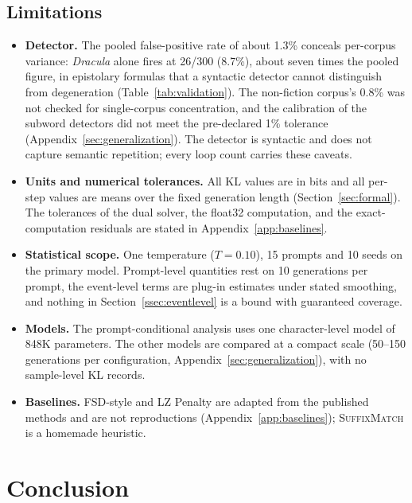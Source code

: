 \documentclass[11pt]{article}
\begin{document}
\subsection{Limitations}
\begin{itemize}[leftmargin=*]
  \item \textbf{Detector.} The pooled false-positive rate of about 1.3\% conceals per-corpus variance: \emph{Dracula} alone fires at 26/300 (8.7\%), about seven times the pooled figure, in epistolary formulas that a syntactic detector cannot distinguish from degeneration (Table~\ref{tab:validation}). The non-fiction corpus's 0.8\% was not checked for single-corpus concentration, and the calibration of the subword detectors did not meet the pre-declared 1\% tolerance (Appendix~\ref{sec:generalization}). The detector is syntactic and does not capture semantic repetition; every loop count carries these caveats.
  \item \textbf{Units and numerical tolerances.} All KL values are in bits and all per-step values are means over the fixed generation length (Section~\ref{sec:formal}). The tolerances of the dual solver, the float32 computation, and the exact-computation residuals are stated in Appendix~\ref{app:baselines}.
  \item \textbf{Statistical scope.} One temperature ($T{=}0.10$), 15 prompts and 10 seeds on the primary model. Prompt-level quantities rest on 10 generations per prompt, the event-level terms are plug-in estimates under stated smoothing, and nothing in Section~\ref{ssec:eventlevel} is a bound with guaranteed coverage.
  \item \textbf{Models.} The prompt-conditional analysis uses one character-level model of 848K parameters. The other models are compared at a compact scale (50--150 generations per configuration, Appendix~\ref{sec:generalization}), with no sample-level KL records.
  \item \textbf{Baselines.} FSD-style and LZ Penalty are adapted from the published methods and are not reproductions (Appendix~\ref{app:baselines}); \textsc{SuffixMatch} is a homemade heuristic.
\end{itemize}

\section{Conclusion}
\end{document}

